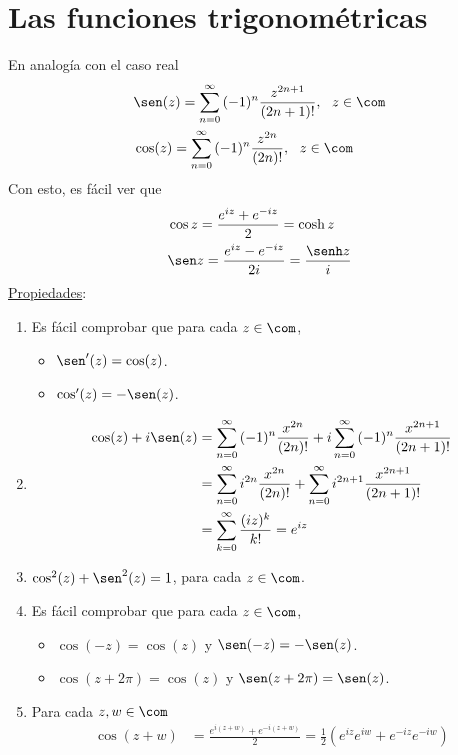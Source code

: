 \section{Las funciones trigonométricas}
En analogía con el caso real
\begin{align*}
    &\sen(z) = \sum_{n=0}^{\infty}{(-1)^n\frac{z^{2n+1}}{(2n+1)!}}, \ \ z \in \com \\
    &\cos(z) = \sum_{n=0}^{\infty}{(-1)^n\frac{z^{2n}}{(2n)!}}, \ \ z \in \com
\end{align*}
Con esto, es fácil ver que
\begin{align*}
    &\cos z = \frac{e^{iz}+e^{-iz}}{2} = \cosh z \\
    &\sen z = \frac{e^{iz}-e^{-iz}}{2i} = \frac{\senh z}{i}
\end{align*}
\underline{Propiedades}:
\begin{enumerate}
    \item Es fácil comprobar que para cada $z \in \com$,
    \begin{itemize}
        \item $\sen'(z) = \cos(z)$.
        \item $\cos'(z) = -\sen(z)$.
    \end{itemize}
    \item
    \begin{align*}
        \cos(z) + i\sen(z) &= \sum_{n=0}^{\infty}{(-1)^n\frac{x^{2n}}{(2n)!}} + i\sum_{n=0}^{\infty}{(-1)^n\frac{x^{2n+1}}{(2n+1)!}} \\
        &= \sum_{n=0}^{\infty}{i^{2n}\frac{x^{2n}}{(2n)!}} + \sum_{n=0}^{\infty}{i^{2n+1}\frac{x^{2n+1}}{(2n+1)!}} \\
        &= \sum_{k=0}^{\infty}{\frac{(iz)^k}{k!}} = e^{iz}
    \end{align*}
    \item $\cos^2(z) + \sen^2(z) = 1$, para cada $z \in \com$.
    \item Es fácil comprobar que para cada $z \in \com$,
    \begin{itemize}
        \item $\cos(-z) = \cos(z)$ y $\sen(-z) = -\sen(z)$.
        \item $\cos(z + 2\pi) = \cos(z)$ y $\sen(z +2\pi) = \sen(z)$.
    \end{itemize}
    \item Para cada $z,w \in \com$
    \begin{align*}
        \cos(z+w) &= \frac{e^{i(z+w)} + e^{-i(z+w)}}{2} = \frac{1}{2}\left( e^{iz}e^{iw} + e^{-iz}e^{-iw}\right)  \\

\end{align*}
\end{enumerate}
